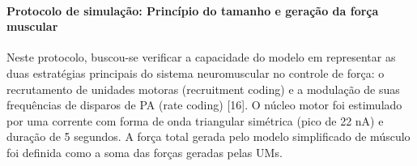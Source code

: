 \paragraph{Protocolo de simulação: Princípio do tamanho e geração da força muscular}
Neste protocolo, buscou-se verificar a capacidade do modelo em representar as duas estratégias principais do sistema neuromuscular no controle de força: o recrutamento de unidades motoras (recruitment coding) e a modulação de suas frequências de disparos de PA (rate coding) [16]. O núcleo motor foi estimulado por uma corrente com forma de onda triangular simétrica (pico de 22 nA) e duração de 5 segundos. A força total gerada pelo modelo simplificado de músculo foi definida como a soma das forças geradas pelas UMs.